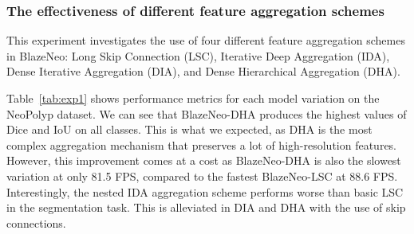\documentclass{ieeeaccess}
\newcommand{\ModelName}{BlazeNeo\xspace}
\newcommand{\DHA}{BlazeNeo-DHA\xspace}
\newcommand{\LSC}{BlazeNeo-LSC\xspace}
\newcommand{\DatasetName}{NeoPolyp\xspace}
\begin{document}
\subsubsection{The effectiveness of different feature aggregation schemes}
This experiment investigates the use of four different feature aggregation schemes in \ModelName{}: Long Skip Connection (LSC), Iterative Deep Aggregation (IDA), Dense Iterative Aggregation (DIA), and Dense Hierarchical Aggregation (DHA).

Table~\ref{tab:exp1} shows performance metrics for each model variation on the \DatasetName dataset. We can see that \DHA produces the highest values of Dice and IoU on all classes. This is what we expected, as DHA is the most complex aggregation mechanism that preserves a lot of high-resolution features. However, this improvement comes at a cost as \DHA is also the slowest variation at only 81.5 FPS, compared to the fastest \LSC at 88.6 FPS. Interestingly, the nested IDA aggregation scheme performs worse than basic LSC in the segmentation task. This is alleviated in DIA and DHA with the use of skip connections.
\end{document}
